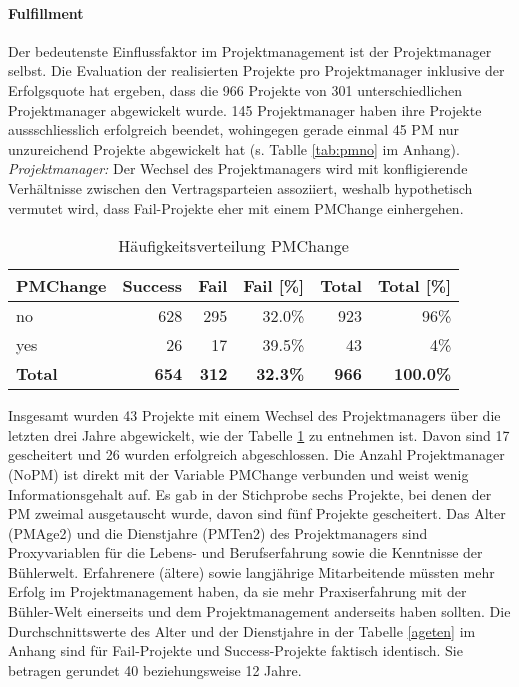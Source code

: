 \paragraph{Fulfillment} Der bedeutenste Einflussfaktor im Projektmanagement ist der Projektmanager selbst. Die Evaluation der realisierten Projekte pro Projektmanager inklusive der Erfolgsquote hat ergeben, dass die 966 Projekte von 301 unterschiedlichen Projektmanager abgewickelt wurde. 145 Projektmanager haben ihre Projekte aussschliesslich erfolgreich beendet, wohingegen gerade einmal 45 PM nur unzureichend Projekte abgewickelt hat (s. Tablle \ref{tab:pmno} im Anhang).
%
%
\newline\newline\textit{Projektmanager:} Der Wechsel des Projektmanagers wird mit konfligierende Verhältnisse zwischen den Vertragsparteien assoziiert, weshalb hypothetisch vermutet wird, dass Fail-Projekte eher mit einem PMChange einhergehen. 
\begin{table}[H]
	\centering
	\caption{Häufigkeitsverteilung PMChange}
	\begin{tabular}{lrrrrr}
		\textbf{PMChange} & \multicolumn{1}{l}{\textbf{Success}} & \multicolumn{1}{l}{\textbf{Fail}} & \multicolumn{1}{l}{\textbf{Fail [\%]}} & \multicolumn{1}{l}{\textbf{Total}} &
		\multicolumn{1}{l}{\textbf{Total [\%]}} \\\hline
		no    & 628   & 295   & 32.0\% & 923 & 96\% \\
		yes   & 26    & 17    & 39.5\% & 43  & 4\% \\\hline
		\textbf{Total} & \textbf{654} & \textbf{312} & \textbf{32.3\%} & \textbf{966} & \textbf{100.0\%} \\
	\end{tabular}%
	\label{pmchange}%
\end{table}%
Insgesamt wurden 43 Projekte mit einem Wechsel des Projektmanagers über die letzten drei Jahre abgewickelt, wie der Tabelle \ref{pmchange} zu entnehmen ist. Davon sind 17 gescheitert und 26 wurden erfolgreich abgeschlossen. Die Anzahl Projektmanager (NoPM) ist direkt mit der Variable PMChange verbunden und weist wenig Informationsgehalt auf. Es gab in der Stichprobe sechs Projekte, bei denen der PM zweimal ausgetauscht wurde, davon sind fünf Projekte gescheitert.
%
%
\newline Das Alter (PMAge2) und die Dienstjahre (PMTen2) des Projektmanagers sind Proxyvariablen für die Lebens- und Berufserfahrung sowie die Kenntnisse der Bühlerwelt. Erfahrenere (ältere) sowie langjährige Mitarbeitende müssten mehr Erfolg im Projektmanagement haben, da sie mehr Praxiserfahrung mit der Bühler-Welt einerseits und dem Projektmanagement anderseits haben sollten. Die Durchschnittswerte des Alter und der Dienstjahre in der Tabelle \ref{ageten} im Anhang sind für Fail-Projekte und Success-Projekte faktisch identisch. Sie betragen gerundet 40 beziehungsweise 12 Jahre.
